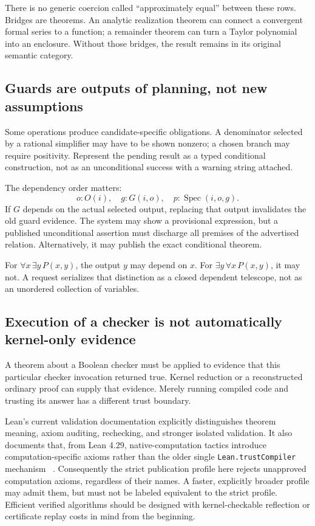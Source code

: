 \documentclass[11pt,letterpaper]{article}
\newcommand{\code}[1]{\nolinkurl{#1}}
\newcommand{\Spec}{\operatorname{Spec}}
\theoremstyle{definition}
\theoremstyle{remark}
\begin{document}
There is no generic coercion called ``approximately equal'' between these rows.
Bridges are theorems. An analytic realization theorem can connect a convergent
formal series to a function; a remainder theorem can turn a Taylor polynomial
into an enclosure. Without those bridges, the result remains in its original
semantic category.

\subsection{Guards are outputs of planning, not new assumptions}
Some operations produce candidate-specific obligations. A denominator selected
by a rational simplifier may have to be shown nonzero; a chosen branch may
require positivity. Represent the pending result as a typed conditional
construction, not as an unconditional success with a warning string attached.

The dependency order matters:
\[
 o:O(i),\quad g:G(i,o),\quad p:\Spec(i,o,g).
\]
If $G$ depends on the actual selected output, replacing that output invalidates
the old guard evidence. The system may show a provisional expression, but a
published unconditional assertion must discharge all premises of the advertised
relation. Alternatively, it may publish the exact conditional theorem.

For $\forall x\,\exists y\,P(x,y)$, the output $y$ may depend on $x$. For
$\exists y\,\forall x\,P(x,y)$, it may not. A request serializes that distinction
as a closed dependent telescope, not as an unordered collection of variables.

\subsection{Execution of a checker is not automatically kernel-only evidence}
A theorem about a Boolean checker must be applied to evidence that this particular
checker invocation returned true. Kernel reduction or a reconstructed ordinary
proof can supply that evidence. Merely running compiled code and trusting its
answer has a different trust boundary.

Lean's current validation documentation explicitly distinguishes theorem meaning,
axiom auditing, rechecking, and stronger isolated validation. It also documents
that, from Lean 4.29, native-computation tactics introduce computation-specific
axioms rather than the older single \code{Lean.trustCompiler} mechanism
~\cite{lean-validation}. Consequently the strict publication profile here rejects
unapproved computation axioms, regardless of their names. A faster, explicitly
broader profile may admit them, but must not be labeled equivalent to the strict
profile. Efficient verified algorithms should be designed with kernel-checkable
reflection or certificate replay costs in mind from the beginning.
\end{document}
